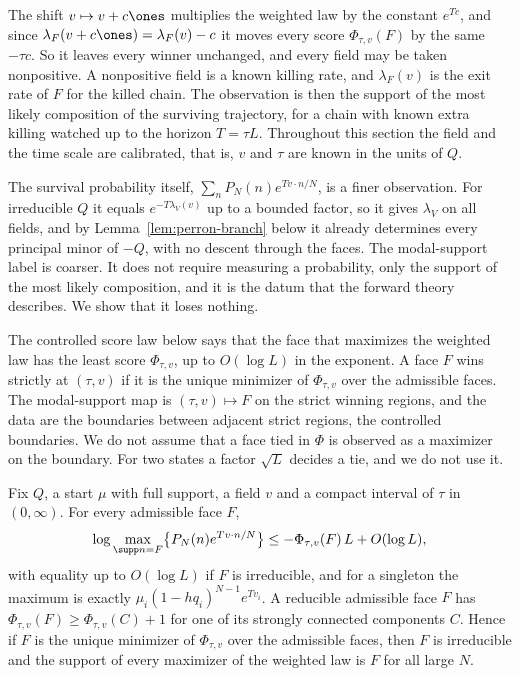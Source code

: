 The shift $v\mapsto v+c\ones$ multiplies the weighted law by the constant
$e^{Tc}$, and since $\lambda_F(v+c\ones)=\lambda_F(v)-c$ it moves every score
$\Phi_{\tau,v}(F)$ by the same $-\tau c$. So it leaves every winner unchanged,
and every field may be taken nonpositive. A nonpositive field is a known killing
rate, and $\lambda_F(v)$ is the exit rate of $F$ for the killed chain. The
observation is then the support of the most likely composition of the surviving
trajectory, for a chain with known extra killing watched up to the horizon
$T=\tau L$. Throughout this section the field and the time scale are
calibrated, that is, $v$ and $\tau$ are known in the units of $Q$.

The survival probability itself, $\sum_nP_N(n)e^{Tv\cdot n/N}$, is a finer
observation. For irreducible $Q$ it equals $e^{-T\lambda_V(v)}$ up to a bounded
factor, so it gives $\lambda_V$ on all fields, and by
Lemma~\ref{lem:perron-branch} below it already determines every principal minor
of $-Q$, with no descent through the faces. The modal-support label is coarser.
It does not require measuring a probability, only the support of the most likely
composition, and it is the datum that the forward theory describes. We show that
it loses nothing.

The controlled score law below says that the face that maximizes the weighted
law has the least score $\Phi_{\tau,v}$, up to $O(\log L)$ in the exponent. A
face $F$ wins strictly at $(\tau,v)$ if it is the unique minimizer of
$\Phi_{\tau,v}$ over the admissible faces. The modal-support map is
$(\tau,v)\mapsto F$ on the strict winning regions, and the data are the
boundaries between adjacent strict regions, the controlled boundaries. We do not assume that a face tied
in $\Phi$ is observed as a maximizer on the boundary. For two states a factor
$\sqrt{L}$ decides a tie, and we do not use it.

\begin{proposition}\label{prop:controlled-score}
Fix $Q$, a start $\mu$ with full support, a field $v$ and a compact interval of
$\tau$ in $(0,\infty)$. For every admissible face $F$,
\[
 \log\max_{\supp n=F}\bigl\{P_N(n)e^{Tv\cdot n/N}\bigr\}
 \le-\Phi_{\tau,v}(F)\,L+O(\log L),
\]
with equality up to $O(\log L)$ if $F$ is irreducible, and for a singleton the
maximum is exactly $\mu_i(1-hq_i)^{N-1}e^{Tv_i}$. A reducible admissible face
$F$ has $\Phi_{\tau,v}(F)\ge\Phi_{\tau,v}(C)+1$ for one of its strongly
connected components $C$. Hence if $F$ is the unique minimizer of
$\Phi_{\tau,v}$ over the admissible faces, then $F$ is irreducible and the
support of every maximizer of the weighted law is $F$ for all large $N$.
\end{proposition}

